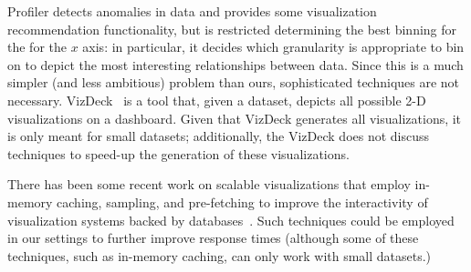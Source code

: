 

Profiler 
detects anomalies in data \cite{DBLP:conf/avi/KandelPPHH12} and provides
some visualization recommendation functionality,
but is restricted determining the best binning for the
for the $x$ axis: in particular, it decides which granularity
is appropriate to bin on to depict the most interesting relationships 
between data. 
Since this is a much simpler (and less ambitious) problem
than ours, sophisticated techniques are not necessary.
VizDeck~\cite{DBLP:conf/sigmod/KeyHPA12} is a tool that, given a dataset,
depicts all possible 2-D visualizations on a dashboard.
Given that VizDeck generates all visualizations, it is only meant for 
small datasets; additionally, the VizDeck does not discuss techniques
to speed-up the generation of these visualizations. 


  There has been some recent work on
scalable visualizations that employ in-memory caching, sampling, and
pre-fetching to improve the interactivity of visualization systems
backed by
databases~\cite{2013-immens,DBLP:conf/avi/KandelPPHH12,hotmap,doshi2003prefetching,DBLP:journals/corr/KimBPIMR14}.
Such techniques could be employed in our settings to further improve
response times (although some of these techniques, such as in-memory caching,
can only work with small datasets.)


